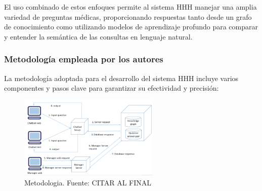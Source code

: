 El uso combinado de estos enfoques permite al sistema HHH manejar una amplia variedad de preguntas médicas, proporcionando respuestas tanto desde un grafo de conocimiento como utilizando modelos de aprendizaje profundo para comparar y entender la semántica de las consultas en lenguaje natural.

\subsubsection{Metodología empleada por los autores}
La metodología adoptada para el desarrollo del sistema HHH incluye varios componentes y pasos clave para garantizar su efectividad y precisión:

\begin{figure}[h]
	\begin{center}
		\includegraphics[width=0.6\textwidth]{2/1_antecedentes/Metodologia-5.png}
		\caption{Metodologia. Fuente: CITAR AL FINAL }
	\end{center}
\end{figure}

